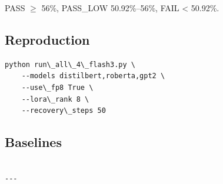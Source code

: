 PASS $\ge$ 56\%, PASS\_LOW 50.92\%--56\%, FAIL \textless{} 50.92\%.

\subsection{Reproduction}

\begin{lstlisting}
python run\_all\_4\_flash3.py \
    --models distilbert,roberta,gpt2 \
    --use\_fp8 True \
    --lora\_rank 8 \
    --recovery\_steps 50
\end{lstlisting}

\subsection{Baselines}

\begin{lstlisting}

---
\end{lstlisting}